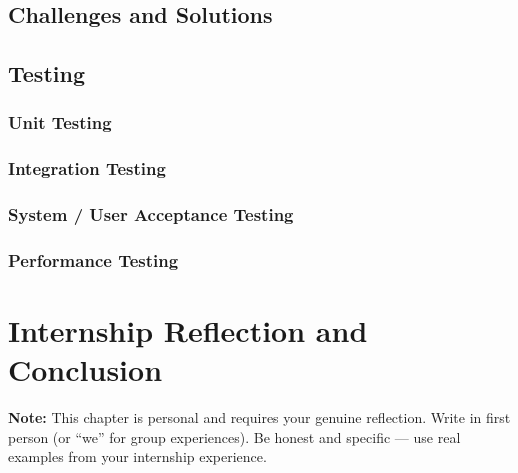 ﻿\documentclass[12pt, a4paper]{article}
\begin{document}
\subsection{Challenges and Solutions}



\subsection{Testing}

\subsubsection*{Unit Testing}



\subsubsection*{Integration Testing}



\subsubsection*{System / User Acceptance Testing}



\subsubsection*{Performance Testing}



\clearpage

\section{Internship Reflection and Conclusion}

\begin{tcolorbox}[enhanced, colback=accentgold!10, colframe=accentgold, arc=3pt, boxrule=1pt, top=6pt, bottom=6pt]
\textbf{Note:} This chapter is personal and requires your genuine reflection. Write in first person (or ``we'' for group experiences). Be honest and specific --- use real examples from your internship experience.
\end{tcolorbox}
\end{document}
